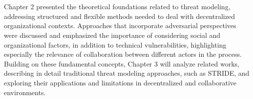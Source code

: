 \section*{} 
Chapter 2 presented the theoretical foundations related to threat modeling,
addressing structured and flexible methods needed to deal with decentralized
organizational contexts. Approaches that incorporate adversarial perspectives
were discussed and emphasized the importance of considering social and
organizational factors, in addition to technical vulnerabilities, highlighting
especially the relevance of collaboration between different actors in the
process. Building on these fundamental concepts, Chapter 3 will analyze related
works, describing in detail traditional threat modeling approaches, such as
STRIDE, and exploring their applications and limitations in decentralized and
collaborative environments.
